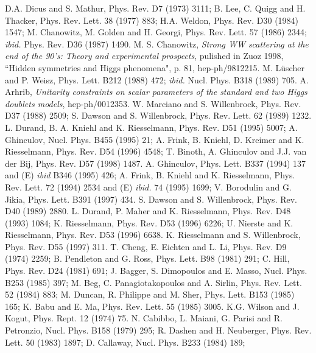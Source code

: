 \begin{thebibliography}{999}
 D.A. Dicus and S. Mathur, Phys. Rev. D7 (1973) 3111;
B. Lee, C. Quigg and H. Thacker, Phys. Rev. Lett. 38 (1977)  883; H.A. Weldon, 
Phys. Rev. D30 (1984) 1547;  M. Chanowitz, M. Golden and H. Georgi, 
Phys. Rev. Lett. 57 (1986) 2344; {\it ibid.} Phys. Rev. D36 (1987) 1490. 
%
 M. S. Chanowitz, {\it Strong WW scattering at the end of 
the 90's: Theory and experimental  prospects}, pulished in Zuoz 1998, ``Hidden 
symmetries and Higgs phenomena", p. 81, hep-ph/9812215.
%
 M. L\"uscher and P. Weisz, Phys. Lett. B212 (1988) 472;  
{\it ibid.} Nucl. Phys. B318 (1989) 705.
%
 A. Arhrib, {\it Unitarity constraints on scalar parameters 
of the standard and two  Higgs doublets models}, hep-ph/0012353.
%
W. Marciano and S. Willenbrock, Phys. Rev. D37 (1988)  2509;
S. Dawson and S. Willenbrock, Phys. Rev. Lett. 62 (1989) 1232. 
%
L. Durand, B. A. Kniehl and K. Riesselmann, Phys. Rev. D51 (1995) 5007;
A. Ghinculov, Nucl. Phys. B455 (1995) 21;  
A. Frink, B. Kniehl, D. Kreimer and K. Riesselmann, Phys. Rev. D54 (1996) 4548;
T. Binoth, A. Ghinculov and J.J. van der Bij, Phys. Rev. D57 (1998) 1487.
%
A. Ghinculov, Phys. Lett. B337 (1994) 137 and (E) {\it ibid} B346 (1995) 426;  
A. Frink, B. Kniehl and K. Riesselmann, Phys. Rev. Lett. 72 (1994) 2534 and
(E) {\it ibid.} 74 (1995) 1699;
V. Borodulin and G. Jikia, Phys. Lett. B391 (1997) 434.
%
 S. Dawson and S. Willenbrock, Phys. Rev. D40 (1989) 2880.
% 
 L. Durand, P. Maher and K. Riesselmann, Phys. Rev. D48 (1993)
1084; K. Riesselmann, Phys. Rev. D53 (1996) 6226; U. Nierste and  
K. Riesselmann, Phys. Rev. D53 (1996) 6638.
%
K. Riesselmann and S. Willenbrock, Phys. Rev. D55 (1997) 311.  
%
 T. Cheng, E. Eichten and L. Li, Phys. Rev. D9 (1974) 2259;
B. Pendleton and G. Ross,  Phys. Lett. B98 (1981) 291;
C. Hill, Phys. Rev. D24 (1981) 691;
J. Bagger, S. Dimopoulos and E. Masso, Nucl. Phys. B253 (1985) 397;
M. Beg, C. Panagiotakopoulos and A. Sirlin, Phys. Rev. Lett. 52 (1984) 883;
M. Duncan, R. Philippe and M. Sher,  Phys. Lett. B153 (1985) 165;
K. Babu and E. Ma,  Phys. Rev. Lett. 55 (1985) 3005.
%
 K.G. Wilson and J. Kogut, Phys. Rept. 12 (1974) 75.
%
N. Cabibbo, L. Maiani, G. Parisi and R. Petronzio, Nucl. Phys. B158 (1979) 295;
R. Dashen and H. Neuberger, Phys. Rev. Lett.  50 (1983) 1897; 
D. Callaway, Nucl. Phys. B233 (1984) 189;

\end{thebibliography}
